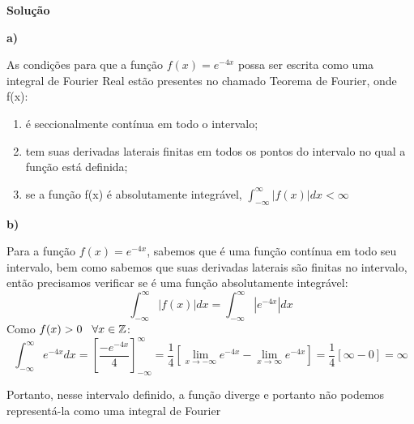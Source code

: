 \linespread{1.5}

\textbf{Solução}

\textbf{a)}

As condições para que a função $f(x) = e^{-4x}$ possa ser escrita como uma integral de Fourier Real estão presentes no chamado Teorema de Fourier, onde f(x):
\begin{enumerate}[I]
    \item é seccionalmente contínua em todo o intervalo;
    \item tem suas derivadas laterais finitas em todos os pontos do intervalo no qual a função está definida;
    \item se a função f(x) é absolutamente integrável, $\int_{-\infty}^\infty |f(x)|dx < \infty$
\end{enumerate}

\textbf{b)}

Para a função $f(x) = e^{-4x}$, sabemos que é uma função contínua em todo seu intervalo, bem como sabemos que suas derivadas laterais são finitas no intervalo, então precisamos verificar se é uma função absolutamente integrável:
\begin{equation*}
    \int_{-\infty}^\infty |f(x)|dx = \int_{-\infty}^\infty |e^{-4x}|dx
\end{equation*}
Como $f(x) > 0 \hspace{.3cm}\forall x\in\mathbb{Z}$:
\begin{equation*}
    \int_{-\infty}^\infty e^{-4x}dx = \left[\frac{-e^{-4x}}{4}\right]_{-\infty}^\infty = \frac{1}{4}\left[\lim_{x\rightarrow-\infty} e^{-4x} - \lim_{x\rightarrow\infty} e^{-4x}\right] = \frac{1}{4}[\infty - 0 ] = \infty
\end{equation*}

Portanto, nesse intervalo definido, a função diverge e portanto não podemos representá-la como uma integral de Fourier 